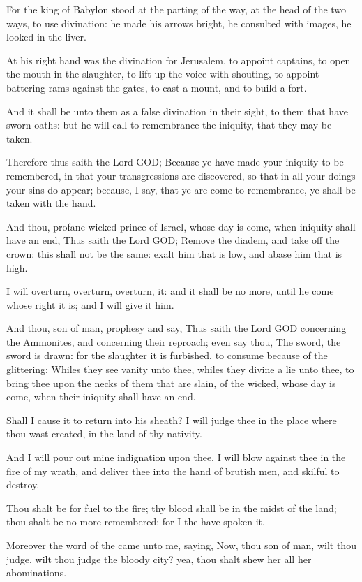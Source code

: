 \Verse For the king of Babylon stood at the parting of the way, at the head of the two ways, to use divination: he made his arrows bright, he consulted with images, he looked in the liver.

\Verse At his right hand was the divination for Jerusalem, to appoint captains, to open the mouth in the slaughter, to lift up the voice with shouting, to appoint battering rams against the gates, to cast a mount, and to build a fort.

\Verse And it shall be unto them as a false divination in their sight, to them that have sworn oaths: but he will call to remembrance the iniquity, that they may be taken.

\Verse Therefore thus saith the Lord GOD; Because ye have made your iniquity to be remembered, in that your transgressions are discovered, so that in all your doings your sins do appear; because, I say, that ye are come to remembrance, ye shall be taken with the hand.

\Verse And thou, profane wicked prince of Israel, whose day is come, when iniquity shall have an end, \Verse Thus saith the Lord GOD; Remove the diadem, and take off the crown: this shall not be the same: exalt him that is low, and abase him that is high.

\Verse I will overturn, overturn, overturn, it: and it shall be no more, until he come whose right it is; and I will give it him.

\Verse And thou, son of man, prophesy and say, Thus saith the Lord GOD concerning the Ammonites, and concerning their reproach; even say thou, The sword, the sword is drawn: for the slaughter it is furbished, to consume because of the glittering: \Verse Whiles they see vanity unto thee, whiles they divine a lie unto thee, to bring thee upon the necks of them that are slain, of the wicked, whose day is come, when their iniquity shall have an end.

\Verse Shall I cause it to return into his sheath? I will judge thee in the place where thou wast created, in the land of thy nativity.

\Verse And I will pour out mine indignation upon thee, I will blow against thee in the fire of my wrath, and deliver thee into the hand of brutish men, and skilful to destroy.

\Verse Thou shalt be for fuel to the fire; thy blood shall be in the midst of the land; thou shalt be no more remembered: for I the \LORD have spoken it.


\Chapter
\Verse Moreover the word of the \LORD came unto me, saying, \Verse Now, thou son of man, wilt thou judge, wilt thou judge the bloody city?  yea, thou shalt shew her all her abominations.

